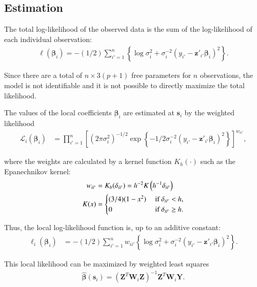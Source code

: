 \documentclass[authoryear, review, 11pt]{elsarticle}
\begin{document}
  \subsection{Estimation}		
  The total log-likelihood of the observed data is the sum of the log-likelihood of each individual observation:
  \begin{align} \label{eq:coefficients}
  	\ell(\bm{\beta}_i) = -(1/2) \sum_{i'=1}^n \left\{ \log{\sigma^2_i}  + \sigma^{-2}_i  \left(y_{i'} - \bm{z}'_{i'} \bm{\beta}_i \right)^2 \right\}.
  \end{align}
	
  Since there are a total of $n \times 3(p+1)$ free parameters for $n$ observations, the model is not identifiable and it is not possible to directly maximize the total likelihood.
  
  The values of the local coefficients $\bm{\beta}_i$ are estimated at $\bm{s}_i$ by the weighted likelihood
  \begin{align}\label{eq:local-likelihood}
    \mathcal{L}_i \left(\bm{\beta}_i \right) &= \prod_{i'=1}^n \left[ \left(2 \pi \sigma^2_i  \right)^{-1/2}  \exp\left\{- 1/2 \sigma^{-2}_i  \left(y_{i'} - \bm{z}'_{i'} \bm{\beta}_i \right)^2 \right\} \right] ^ {w_{ii'}},
  \end{align}
  
  where the weights are calculated by a kernel function $K_h(\cdot)$ such as the Epanechnikov kernel:
  \begin{align}\label{eq:epanechnikov}
    w_{ii'} &= K_h(\delta_{ii'}) = h^{-2} K\left( h^{-1} \delta_{ii'} \right) \notag \\
    K(x) &= \begin{cases} (3/4) (1-x^2) &\mbox{ if } \delta_{ii'} < h, \\ 0 &\mbox{ if } \delta_{ii'} \geq h. \end{cases}
  \end{align}
  
  Thus, the local log-likelihood function is, up to an additive constant: 
  \begin{align}\label{eq:local-log-likelihood}
    \ell_i\left(\bm{\beta}_i\right) &= -(1/2) \sum_{i'=1}^n w_{ii'} \left\{ \log{\sigma^2_i}  + \sigma^{-2}_i  \left(y_{i'} - \bm{z}'_{i'} \bm{\beta}_i \right)^2 \right\}.
  \end{align}
  
  This local likelihood can be maximized by weighted least squares
  \begin{align}\label{eq:beta-hat}
    \hat{\bm{\beta}}(\bm{s}_i) = \left( \bm{Z}^T \bm{W}_i \bm{Z} \right)^{-1} \bm{Z}^T \bm{W}_i \bm{Y}.
  \end{align}
	
\end{document}
